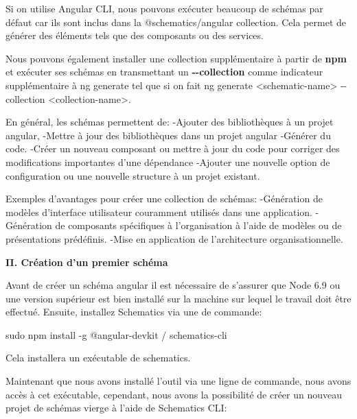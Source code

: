 \documentclass[12pt,french]{article}
\begin{document}
	Si on utilise Angular CLI, nous pouvons exécuter beaucoup de schémas par défaut car ils sont inclus dans la @schematics/angular collection. Cela permet de générer des éléments tels que des composants ou des services.\newline
	
	Nous pouvons également installer une collection supplémentaire à partir de \textbf{npm} et exécuter ses schémas en transmettant un \textbf{\--\--collection} comme indicateur supplémentaire à ng generate tel que si on fait ng generate <schematic-name> \--\--collection <collection-name>.\newline
	
	En général, les schémas permettent de:\smallbreak
		\quad-Ajouter des bibliothèques à un projet angular,\smallbreak
		\quad-Mettre à jour des bibliothèques dans un projet angular\smallbreak
		\quad-Générer du code.\smallbreak
		\quad-Créer un nouveau composant ou mettre à jour du code pour corriger des modifications 		importantes d'une dépendance\smallbreak
		\quad-Ajouter une nouvelle option de configuration ou une nouvelle structure à un projet existant.\newline
		
		Exemples d'avantages pour créer une collection de schémas:\smallbreak
	\quad-Génération de modèles d'interface utilisateur couramment utilisés dans une application.\smallbreak
	\quad-Génération de composants spécifiques à l'organisation à l'aide de modèles ou de 	présentations prédéfinis.\smallbreak
	\quad-Mise en application de l'architecture organisationnelle.
\newline

	\textbf{II. Création d'un premier schéma}\newline
	
	Avant de créer un schéma angular il est nécessaire de s'assurer que Node 6.9 ou une version supérieur est bien installé sur la machine sur lequel le travail doit être effectué. 
	Ensuite, installez Schematics via une de commande:
\newline
	
	\qquad sudo npm install -g @angular-devkit / schematics-cli \newline
	
	Cela installera un exécutable de schematics.\newline
	
	\newpage Maintenant que nous avons installé l'outil via une ligne de commande, nous avons accès à cet exécutable, cependant, nous avons la possibilité de créer un nouveau projet de schémas vierge à l'aide de Schematics CLI:\newline
	
\end{document}
